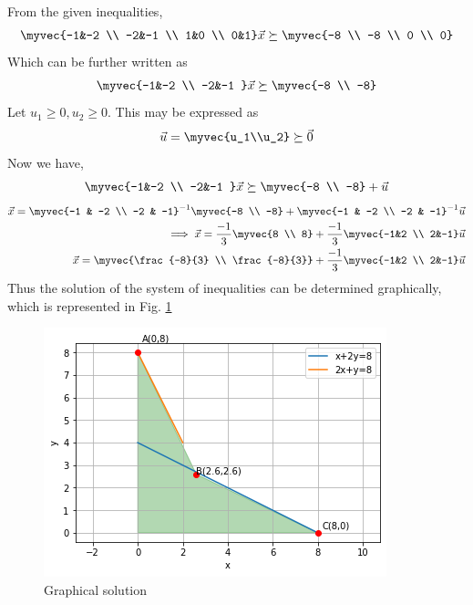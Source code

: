 From the given inequalities,
\begin{align}
    \myvec{-1&-2 \\ -2&-1 \\ 1&0 \\ 0&1}\vec{x} \succeq \myvec{-8 \\ -8 \\ 0 \\ 0}
\end{align}
Which can be further written as
\begin{align}
   \myvec{-1&-2 \\ -2&-1 }\vec{x} \succeq \myvec{-8 \\ -8} 
\end{align}
Let $u_1 \ge 0, u_2 \ge 0$.  This may be expressed as
\begin{align}
\vec{u} = \myvec{u_1\\u_2}\succeq \vec{0}
\end{align}
Now we have,
\begin{align}
  \myvec{-1&-2 \\ -2&-1 }\vec{x} \succeq \myvec{-8 \\ -8}  + \vec{u} 
\end{align}
\begin{align}
        \vec{x} = \myvec{-1 & -2 \\ -2 & -1}^{-1}\myvec{-8 \\ -8} + \myvec{-1 & -2 \\ -2 & -1}^{-1}\vec{u}
        \\
        \implies \vec{x} = \frac{-1}{3}\myvec{8 \\ 8}+\frac{-1}{3}\myvec{-1&2 \\ 2&-1}\vec{u}
        \\
        \vec{x}=\myvec{\frac{-8}{3} \\ \frac{-8}{3}}+\frac{-1}{3}\myvec{-1&2 \\ 2&-1}\vec{u}
    \end{align}
Thus the solution of the system of inequalities can be determined graphically, which is represented in Fig.     \ref{sep/2/4/Graphical solution}
\begin{figure}[ht]
    \centering
    \includegraphics[width=\columnwidth]{solutions/sep/2/4/download.png}
    \caption{Graphical solution}
    \label{sep/2/4/Graphical solution}
\end{figure}


